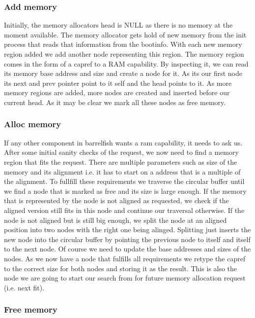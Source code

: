 \subsubsection{Add memory}

Initially, the memory allocators head is NULL as there is no memory at the moment available. The memory allocator gets hold of new memory from the init process that reads that information from the bootinfo. With each new memory region added we add another node representing this region. The memory region comes in the form of a capref to a RAM capability. By inspecting it, we can read its memory base address and size and create a node for it. As its our first node its next and prev pointer point to it self and the head points to it.
As more memory regions are added, more nodes are created and inserted before our current head. As it may be clear we mark all these nodes as free memory.

\subsubsection{Alloc memory}

If any other component in barrelfish wants a ram capability, it needs to ask us. After some initial sanity checks of the request, we now need to find a memory region that fits the request. There are multiple parameters such as size of the memory and its alignment i.e. it has to start on a address that is a multiple of the alignment.
To fullfill these requirements we traverse the circular buffer until we find a node that is marked as free and its size is large enough. If the memory that is represented by the node is not aligned as requested, we check if the aligned version still fits in this node and continue our traversal otherwise.
If the node is not aligned but is still big enough, we split the node at an aligned position into two nodes with the right one being alinged.
Splitting just inserts the new node into the circular buffer by pointing the previous node to itself and itself to the next node. Of course we need to update the base addresses and sizes of the nodes.
As we now have a node that fulfills all requirements we retype the capref to the correct size for both nodes and storing it as the result.
This is also the node we are going to start our search from for future memory allocation request (i.e. next fit).

\subsubsection{Free memory}

